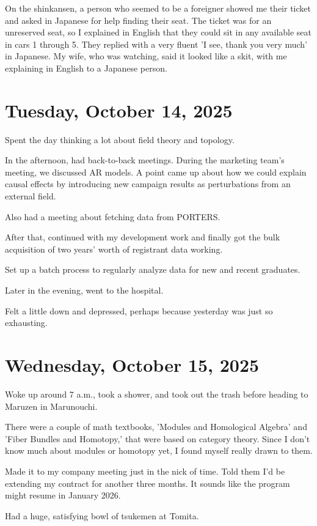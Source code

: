 \documentclass[uplatex]{jsarticle}
\begin{document}
On the shinkansen, a person who seemed to be a foreigner showed me their ticket and asked in Japanese for help finding their seat.
The ticket was for an unreserved seat, so I explained in English that they could sit in any available seat in cars 1 through 5.
They replied with a very fluent 'I see, thank you very much' in Japanese.
My wife, who was watching, said it looked like a skit, with me explaining in English to a Japanese person.


\section{Tuesday, October 14, 2025}

Spent the day thinking a lot about field theory and topology.

In the afternoon, had back-to-back meetings. During the marketing team's meeting, we discussed AR models. A point came up about how we could explain causal effects by introducing new campaign results as perturbations from an external field.

Also had a meeting about fetching data from PORTERS.

After that, continued with my development work and finally got the bulk acquisition of two years' worth of registrant data working.

Set up a batch process to regularly analyze data for new and recent graduates.

Later in the evening, went to the hospital.

Felt a little down and depressed, perhaps because yesterday was just so exhausting.


\section{Wednesday, October 15, 2025}

Woke up around 7 a.m., took a shower, and took out the trash before heading to Maruzen in Marunouchi.

There were a couple of math textbooks, 'Modules and Homological Algebra' and 'Fiber Bundles and Homotopy,' that were based on category theory. Since I don't know much about modules or homotopy yet, I found myself really drawn to them.

Made it to my company meeting just in the nick of time. Told them I'd be extending my contract for another three months. It sounds like the program might resume in January 2026.

Had a huge, satisfying bowl of tsukemen at Tomita.
\end{document}
